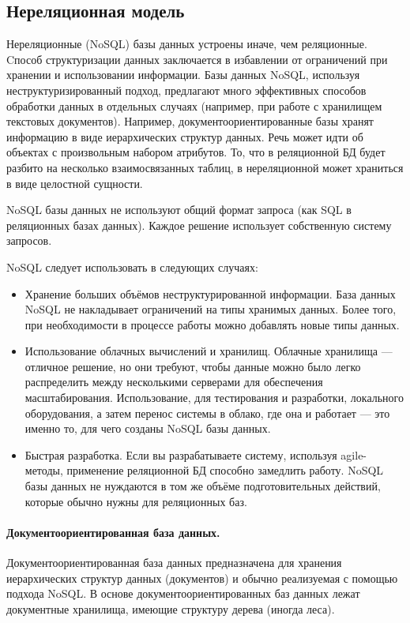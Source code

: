\subsection{Нереляционная модель}
Нереляционные (NoSQL) базы данных устроены иначе, чем реляционные.  Cпособ структуризации данных заключается в избавлении от ограничений при хранении и использовании информации. Базы данных NoSQL, используя неструктуризированный подход, предлагают много эффективных способов обработки данных в отдельных случаях (например, при работе с хранилищем текстовых документов). Например, документоориентированные базы хранят информацию в виде иерархических структур данных. Речь может идти об объектах с произвольным набором атрибутов. То, что в реляционной БД будет разбито на несколько взаимосвязанных таблиц, в нереляционной может храниться в виде целостной сущности.

NoSQL базы данных не используют общий формат запроса (как SQL в реляционных базах данных). Каждое решение использует собственную систему запросов.

NoSQL следует использовать в следующих случаях:
\begin{itemize}
	\item Хранение больших объёмов неструктурированной информации. База данных NoSQL не накладывает ограничений на типы хранимых данных. Более того, при необходимости в процессе работы можно добавлять новые типы данных.
	
	\item Использование облачных вычислений и хранилищ. Облачные хранилища — отличное решение, но они требуют, чтобы данные можно было легко распределить между несколькими серверами для обеспечения масштабирования. Использование, для тестирования и разработки, локального оборудования, а затем перенос системы в облако, где она и работает — это именно то, для чего созданы NoSQL базы данных.
	
	\item Быстрая разработка. Если вы разрабатываете систему, используя agile-методы, применение реляционной БД способно замедлить работу. NoSQL базы данных не нуждаются в том же объёме подготовительных действий, которые обычно нужны для реляционных баз.
\end{itemize}

\paragraph{Документоориентированная база данных.}
Документоориентированная база данных предназначена для хранения иерархических структур данных (документов) и обычно реализуемая с помощью подхода NoSQL. В основе документоориентированных баз данных лежат документные хранилища, имеющие структуру дерева (иногда леса). 

